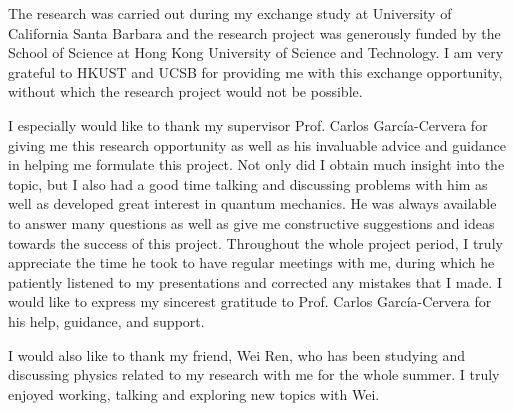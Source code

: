 The research was carried out during my exchange study at University of California Santa Barbara and the research project was generously funded by the School of Science at Hong Kong University of Science and Technology. I am very grateful to HKUST and UCSB for providing me with this exchange opportunity, without which the research project would not be possible. 

I especially would like to thank my supervisor Prof. Carlos García-Cervera for giving me this research opportunity as well as his invaluable advice and guidance in helping me formulate this project. Not only did I obtain much insight into the topic, but I also had a good time talking and discussing problems with him as well as developed great interest in quantum mechanics. He was always available to answer many questions as well as give me constructive suggestions and ideas towards the success of this project. Throughout the whole project period, I truly appreciate the time he took to have regular meetings with me, during which he patiently listened to my presentations and corrected any mistakes that I made. I would like to express my sincerest gratitude to Prof. Carlos García-Cervera for his help, guidance, and support. 

I would also like to thank my friend, Wei Ren, who has been studying and discussing physics related to my research with me for the whole summer. I truly enjoyed working, talking and exploring new topics with Wei. 